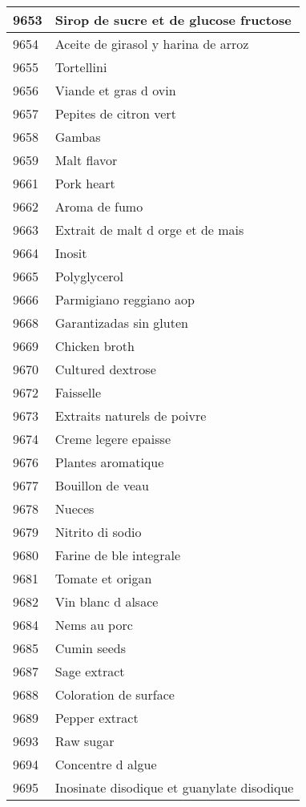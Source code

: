 \begin{longtable}{|l|l|}
9653 & Sirop de sucre et de glucose fructose \\ \hline 
9654 & Aceite de girasol y harina de arroz \\ \hline 
9655 & Tortellini \\ \hline 
9656 & Viande et gras d ovin \\ \hline 
9657 & Pepites de citron vert \\ \hline 
9658 & Gambas \\ \hline 
9659 & Malt flavor \\ \hline 
9661 & Pork heart \\ \hline 
9662 & Aroma de fumo \\ \hline 
9663 & Extrait de malt d orge et de mais \\ \hline 
9664 & Inosit \\ \hline 
9665 & Polyglycerol \\ \hline 
9666 & Parmigiano reggiano aop \\ \hline 
9668 & Garantizadas sin gluten \\ \hline 
9669 & Chicken broth \\ \hline 
9670 & Cultured dextrose \\ \hline 
9672 & Faisselle \\ \hline 
9673 & Extraits naturels de poivre \\ \hline 
9674 & Creme legere epaisse \\ \hline 
9676 & Plantes aromatique \\ \hline 
9677 & Bouillon de veau \\ \hline 
9678 & Nueces \\ \hline 
9679 & Nitrito di sodio \\ \hline 
9680 & Farine de ble integrale \\ \hline 
9681 & Tomate et origan \\ \hline 
9682 & Vin blanc d alsace \\ \hline 
9684 & Nems au porc \\ \hline 
9685 & Cumin seeds \\ \hline 
9687 & Sage extract \\ \hline 
9688 & Coloration de surface \\ \hline 
9689 & Pepper extract \\ \hline 
9693 & Raw sugar \\ \hline 
9694 & Concentre d algue \\ \hline 
9695 & Inosinate disodique et guanylate disodique \\ \hline 

\end{longtable}
